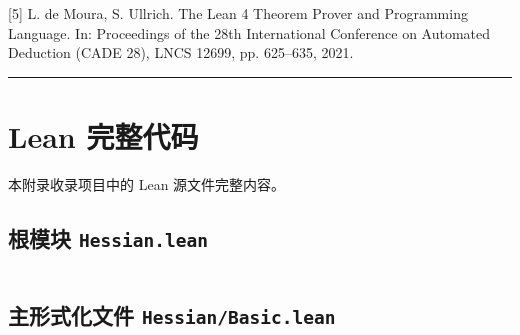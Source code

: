 ﻿\documentclass[UTF8,a4paper,zihao=-4]{ctexart}
\begin{document}
[5] L. de Moura, S. Ullrich. The Lean 4 Theorem Prover and Programming Language. In: Proceedings of the 28th International Conference on Automated Deduction (CADE 28), LNCS 12699, pp. 625–635, 2021.

\bigskip\hrule\bigskip

\clearpage
\appendix
\section{Lean 完整代码}
本附录收录项目中的 Lean 源文件完整内容。

\subsection{根模块 \texttt{Hessian.lean}}
\inputminted{lean4}{Hessian.lean}

\subsection{主形式化文件 \texttt{Hessian/Basic.lean}}
\inputminted{lean4}{Hessian/Basic.lean}
\end{document}
